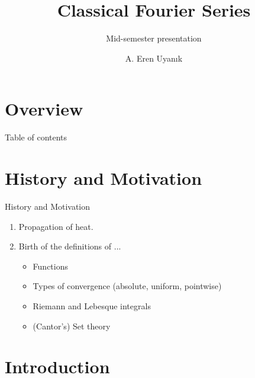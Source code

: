 \documentclass{beamer}
\author{A. Eren Uyanık}
\title{Classical Fourier Series}
\subtitle{Mid-semester presentation}
\begin{document}
\begin{frame}[plain]
  \titlepage
\end{frame}

\section{Overview}


%
%
\begin{frame}{Table of contents}
    \tableofcontents[currentsection]
\end{frame}


\section{History and Motivation}



\begin{frame}{History and Motivation}
\small
\begin{enumerate}
    \item Propagation of heat.
    \item Birth of the definitions of ...
    \begin{itemize}
        \item Functions
        \item Types of convergence (absolute, uniform, pointwise)
        \item Riemann and Lebesque integrals
        \item (Cantor's) Set theory
    \end{itemize}
\end{enumerate}
\end{frame}




\section{Introduction}
\end{document}
